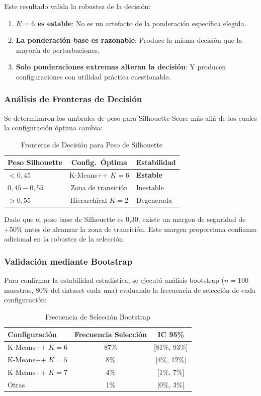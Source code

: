 Este resultado valida la robustez de la decisión:
\begin{enumerate}
    \item \textbf{$K=6$ es estable}: No es un artefacto de la ponderación específica elegida.
    \item \textbf{La ponderación base es razonable}: Produce la misma decisión que la mayoría de perturbaciones.
    \item \textbf{Solo ponderaciones extremas alteran la decisión}: Y producen configuraciones con utilidad práctica cuestionable.
\end{enumerate}

\subsubsection{Análisis de Fronteras de Decisión}

Se determinaron los umbrales de peso para Silhouette Score más allá de los cuales la configuración óptima cambia:

\begin{table}[htbp]
\centering
\caption{Fronteras de Decisión para Peso de Silhouette}
\label{tab:fronteras-decision}
\begin{tabular}{lcl}
\toprule
\textbf{Peso Silhouette} & \textbf{Config.\ Óptima} & \textbf{Estabilidad} \\
\midrule
$< 0{,}45$ & K-Means++ $K=6$ & \textbf{Estable} \\
$0{,}45 - 0{,}55$ & Zona de transición & Inestable \\
$> 0{,}55$ & Hierarchical $K=2$ & Degenerada \\
\bottomrule
\end{tabular}
\end{table}

Dado que el peso base de Silhouette es 0,30, existe un margen de seguridad de +50\% antes de alcanzar la zona de transición. Este margen proporciona confianza adicional en la robustez de la selección.

\subsubsection{Validación mediante Bootstrap}

Para confirmar la estabilidad estadística, se ejecutó análisis bootstrap ($n=100$ muestras, 80\% del dataset cada una) evaluando la frecuencia de selección de cada configuración:

\begin{table}[htbp]
\centering
\caption{Frecuencia de Selección Bootstrap}
\label{tab:bootstrap-seleccion}
\begin{tabular}{lcc}
\toprule
\textbf{Configuración} & \textbf{Frecuencia Selección} & \textbf{IC 95\%} \\
\midrule
K-Means++ $K=6$ & 87\% & [81\%, 93\%] \\
K-Means++ $K=5$ & 8\% & [4\%, 12\%] \\
K-Means++ $K=7$ & 4\% & [1\%, 7\%] \\
Otras & 1\% & [0\%, 3\%] \\
\bottomrule
\end{tabular}
\end{table}

